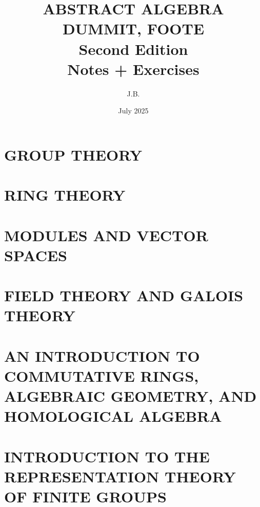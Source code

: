 \documentclass[a4paper,10pt]{book}
\title{ABSTRACT ALGEBRA\\
    \large DUMMIT, FOOTE\\
    \large Second Edition\\
	\large Notes + Exercises\\
}
\author{J.B.}
\date{\small July 2025
}
\theoremstyle{plain} %
\theoremstyle{noparens}
\theoremstyle{plain} %
\begin{document}
\maketitle
{\sffamily
\tableofcontents
}

\clearpage{}

\setcounter{chapter}{0}

\part{GROUP THEORY}






\part{RING THEORY}



\part{MODULES AND VECTOR SPACES}



\part{FIELD THEORY AND GALOIS THEORY}


\part{AN INTRODUCTION TO COMMUTATIVE RINGS, ALGEBRAIC GEOMETRY, AND HOMOLOGICAL ALGEBRA}



\part{INTRODUCTION TO THE REPRESENTATION THEORY OF FINITE GROUPS}




\end{document}
